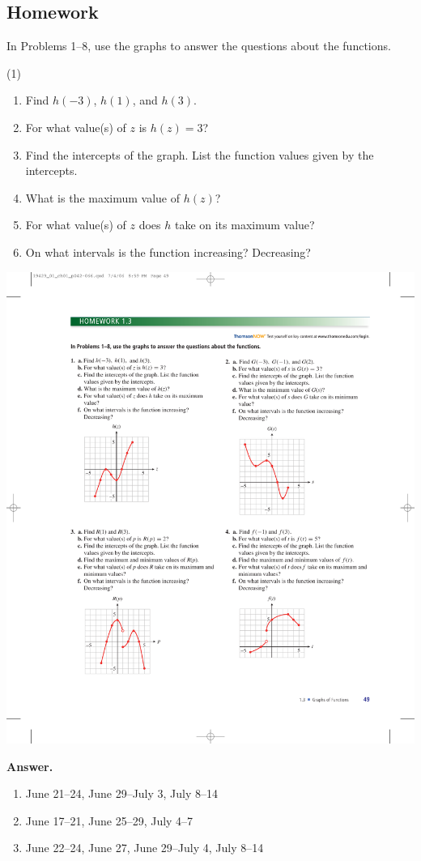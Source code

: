 \documentclass[10pt,]{book}
\theoremstyle{plain}
\theoremstyle{definition}
\theoremstyle{definition}
\theoremstyle{definition}
\theoremstyle{definition}
\numberwithin{equation}{part}
\begin{document}
\subsection[{Homework}]{Homework}\label{section-1-3-exercises}
\hypertarget{exercisegroup-16}{}\par\noindent In Problems 1–8, use the graphs to answer the questions about the functions.%
\begin{exercisegroup}(1)
\exercise[1.]\hypertarget{exercise-158}{}\leavevmode%
\begin{enumerate}[label=*\alph**]
\item\hypertarget{li-653}{}Find \(h(-3)\), \(h(1)\), and \(h(3)\).%
\item\hypertarget{li-654}{}For what value(s) of \(z\) is \(h(z) = 3\)?%
\item\hypertarget{li-655}{}Find the intercepts of the graph. List the function values given by the intercepts.%
\item\hypertarget{li-656}{}What is the maximum value of \(h(z)\)?%
\item\hypertarget{li-657}{}For what value(s) of \(z\) does \(h\) take on its maximum value?%
\item\hypertarget{li-658}{}On what intervals is the function increasing? Decreasing?%
\end{enumerate}
 \includegraphics[width=0.5\linewidth]{images/fig-ex-1-3-1}
%
\par\smallskip
\noindent\textbf{Answer.}\hypertarget{answer-93}{}\quad
\leavevmode%
\begin{enumerate}[label=*\alph**]
\item\hypertarget{li-659}{}June 21–24, June 29–July 3, July 8–14%
\item\hypertarget{li-660}{}June 17–21, June 25–29, July 4–7%
\item\hypertarget{li-661}{}June 22–24, June 27, June 29–July 4, July 8–14%

\end{enumerate}
\end{exercisegroup}
\end{document}
